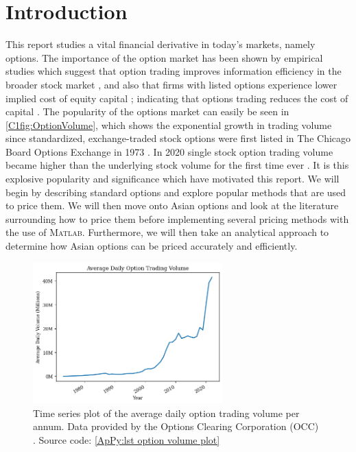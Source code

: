 \chapter{Introduction}

This report studies a vital financial derivative in today's markets, namely options. The importance of the option market has been shown by empirical studies which suggest that option trading improves information efficiency in the broader stock market \cite{PanInfoEffic,li2021effect}, and also that firms with listed options experience lower implied cost of equity capital \cite{naikerLowEquity}; indicating that options trading reduces the cost of capital \cite{li2021effect}. The popularity of the options market can easily be seen in \autoref{C1fig:OptionVolume}, which shows the exponential growth in trading volume since standardized, exchange-traded stock options were first listed in The Chicago Board Options Exchange in 1973 \cite{markham2002financial}. In 2020 single stock option trading volume became higher than the underlying stock volume for the first time ever \cite{yahooOptions}. 
\nline
It is this explosive popularity and significance which have motivated this report. We will begin by describing standard options and explore popular methods that are used to price them. We will then move onto Asian options and look at the literature surrounding how to price them before implementing several pricing methods with the use of \textsc{Matlab}. Furthermore, we will then take an analytical approach to determine how Asian options can be priced accurately and efficiently.

\begin{figure}[H]
    \centering
    \includegraphics[width=0.65\textwidth]{Chapters/C1/plots/OptionVolume.png}
    \caption{Time series plot of the average daily option trading volume per annum. Data provided by the Options Clearing Corporation (OCC) \cite{THEOCC}. 
    Source code: \autoref{ApPy:lst option volume plot}
    }
    \label{C1fig:OptionVolume}
\end{figure}

